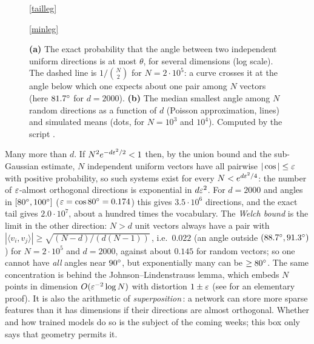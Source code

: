 \begin{figure}[tb]
\par\smallskip\ref{tailleg}\par\smallskip\ref{minleg}
\caption{\textbf{(a)} The exact probability that the angle between two independent uniform directions is at most $\theta$, for several dimensions (log scale). The dashed line is $1/\binom N2$ for $N=2\cdot10^5$: a curve crosses it at the angle below which one expects about one pair among $N$ vectors (here $81.7^{\circ}$ for $d=2000$). \textbf{(b)} The median smallest angle among $N$ random directions as a function of $d$ (Poisson approximation, lines) and simulated means (dots, for $N=10^3$ and $10^4$). Computed by the script .}
\label{fig:L8-minangle}
\end{figure}

\begin{beyond}\label{box:L8-packing}
Many more than $d$. If $N^2e^{-d\varepsilon^2/2}<1$ then, by the union bound and the sub-Gaussian estimate, $N$ independent uniform vectors have all pairwise $|\cos|\le\varepsilon$ with positive probability, so such systems exist for every $N<e^{d\varepsilon^2/4}$: the number of $\varepsilon$-almost orthogonal directions is exponential in $d\varepsilon^2$. For $d=2000$ and angles in $[80^{\circ},100^{\circ}]$ ($\varepsilon=\cos80^{\circ}=0.174$) this gives $3.5\cdot10^6$ directions, and the exact tail gives $2.0\cdot10^7$, about a hundred times the vocabulary. The \emph{Welch bound} is the limit in the other direction: $N>d$ unit vectors always have a pair with $|\langle v_i,v_j\rangle|\ge\sqrt{(N-d)/(d(N-1))}$\,\citep{welch1974}, i.e.\ $0.022$ (an angle outside $(88.7^{\circ},91.3^{\circ})$) for $N=2\cdot10^5$ and $d=2000$, against about $0.145$ for random vectors; so one cannot have \emph{all} angles near $90^{\circ}$, but exponentially many can be $\ge80^{\circ}$. The same concentration is behind the Johnson--Lindenstrauss lemma, which embeds $N$ points in dimension $O(\varepsilon^{-2}\log N)$ with distortion $1\pm\varepsilon$ (see \citealp{dasgupta2003} for an elementary proof). It is also the arithmetic of \emph{superposition}\,\citep{elhage2022}: a network can store more sparse features than it has dimensions if their directions are almost orthogonal. Whether and how trained models do so is the subject of the coming weeks; this box only says that geometry permits it.
\end{beyond}

